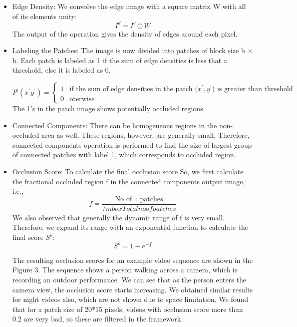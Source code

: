 \documentclass{sig-alternate}
\begin{document}
{{{\begin{itemize}
\begin{displaymath}
I^e(x,y) = \left\{
        \begin{array}{ll}
            1 & \quad \mbox{if edge is detected at pixel I(x, y)} \\
            0 & \quad x > 0
        \end{array}
    \right.
\end{displaymath}
   \item Edge Density: We convolve the edge image with a square
matrix W with all of its elements unity:
 $$
   I^d = I^e \odot W
 $$
 The output of the operation gives the density of edges around
each pixel.
\item
Labeling the Patches: The image is now divided into patches
of block size b × b. Each patch is labeled as 1 if the sum of
edge densities is less that a threshold, else it is labeled as 0.

$$
  I^p(x^{'}y^{'})= \left\{
        \begin{array}{ll}
            1 & \mbox{if the sum of edge densities in the
patch (}x^{'},y^{'}\mbox{) is greater than threshold} \\
            0 & \mbox{oterwise}
        \end{array}
    \right.
$$
The 1’s in the patch image shows potentially occluded regions.
   \item Connected Components: There can be homogeneous regions
in the non-occluded area as well. These regions, however, are
generally small. Therefore, connected components operation
is performed to find the size of largest group of connected
patches with label 1, which corresponds to occluded region.
   \item Occlusion Score: To calculate the final occlusion score So,
we first calculate the fractional occluded region f in the connected
components output image, i.e.,
   $$
     f=\frac{\mbox{No of 1 patches}}{/mbox{Total no of patches}}
   $$
   We also observed that generally the dynamic range of f is very
small. Therefore, we expand its range with an exponential function
to calculate the final score $S^o$:
 $$
   S^o = 1-e^{-f}
 $$
 
 The resulting occlusion scores for an example video sequence
are shown in the Figure 3. The sequence shows a person walking
across a camera, which is recording an outdoor performance. We
can see that as the person enters the camera view, the occlusion
score starts increasing. We obtained similar results for night videos
also, which are not shown due to space limitation. We found that
for a patch size of 20*15 pixels, videos with occlusion score more
than 0.2 are very bad, so these are filtered in the framework.
\end{itemize}

}}}
\end{document}
